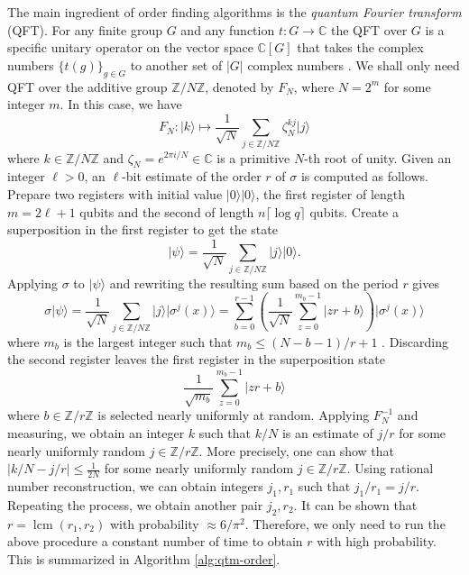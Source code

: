 \documentclass{article}
\theoremstyle{plain}
\theoremstyle{definition}
\newcommand{\ldbrac}[1]{\lvert#1\rangle}
\newcommand{\abs}[1]{\left\vert#1\right\vert}
\DeclareMathOperator{\lcm}{lcm} %
\def\C{\ensuremath{\mathbb{C}}}
\def\Z{\ensuremath{\mathbb{Z}}}
\begin{document}
The main ingredient of order finding algorithms is the \textit{quantum Fourier transform} (QFT). 
For any finite group $G$ and any function $t: G \rightarrow \C$ the QFT over $G$ is a specific 
unitary operator on the vector space $\C[G]$ that takes the complex numbers $\{ t(g) \}_{g \in 
G}$ to another set of $\abs{G}$ complex numbers \cite{hallgren2003hidden}. We shall only need QFT 
over the additive group $\Z/N\Z$, denoted by $F_N$, where $N = 2^m$ for some integer $m$. In this 
case, we have 
\[ F_N: \ldbrac{k} \longmapsto \frac{1}{\sqrt{N}}\sum_{j \in \Z/N\Z}\zeta_N^{kj}\ldbrac{j} \]
where $k \in \Z/N\Z$ and $\zeta_N = e^{2\pi i / N} \in \C$ is a primitive $N$-th root of unity. 
Given an integer $\ell > 0$, an $\ell$-bit estimate of the order $r$ of $\sigma$ is computed as 
follows. Prepare two registers with initial value $\ldbrac{0}\ldbrac{0}$, the first register of 
length $m = 2\ell + 1$ qubits and the second of length $n\lceil \log q \rceil$ qubits. Create a 
superposition in the first register to get the state 
\[ \ldbrac{\psi} = \frac{1}{\sqrt{N}} \sum_{j \in \Z/N\Z} \ldbrac{j}\ldbrac{0}. \]
Applying $\sigma$ to $\ldbrac{\psi}$ and rewriting the resulting sum based on the period $r$ gives
\[ \sigma\ldbrac{\psi} = \frac{1}{\sqrt{N}} \sum_{j \in \Z/N\Z} \ldbrac{j}\ldbrac{\sigma^j(x)} = 
\sum_{b = 0}^{r - 1}\left( \frac{1}{\sqrt{N}}\sum_{z = 0}^{m_b - 1}\ldbrac{zr + b} \right) 
\ldbrac{\sigma^j(x)} \]
where $m_b$ is the largest integer such that $m_b \le (N - b - 1) / r + 1$ 
\cite{kaye2007introduction}. Discarding the second register leaves the first register in the 
superposition state
\[ \frac{1}{\sqrt{m_b}} \sum_{z = 0}^{m_b - 1}\ldbrac{zr + b} \]
where $b \in \Z/r\Z$ is selected nearly uniformly at random. Applying $F_N^{-1}$ and measuring, we 
obtain an integer $k$ such that $k / N$ is an estimate of $j / r$ for some nearly uniformly random 
$j \in \Z/r\Z$. More precisely, one can show that $\abs{k / N - j / r} \le \frac{1}{2N}$ for some 
nearly uniformly random $j \in \Z/r\Z$. Using rational number reconstruction, we can obtain 
integers $j_1, r_1$ such that $j_1 / r_1 = j / r$. Repeating the process, we obtain another pair 
$j_2, r_2$. It can be shown that $r = \lcm(r_1, r_2)$ with probability $\approx 6 / \pi^2$. 
Therefore, we only need to run the above procedure a constant number of time to obtain $r$ with 
high probability. This is summarized in Algorithm \ref{alg:qtm-order}.
\end{document}
